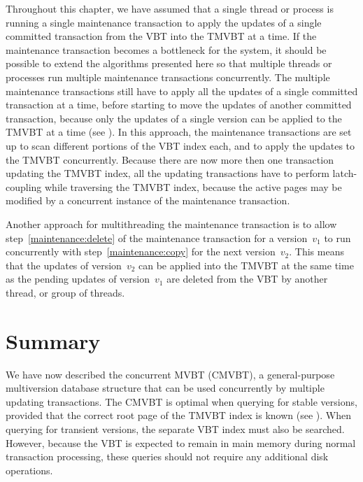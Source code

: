 Throughout this chapter, we have assumed that a single thread or process is
running a single maintenance transaction to apply the updates of a
single committed transaction from the VBT into the TMVBT at a time.
If the maintenance transaction becomes a bottleneck for the system, it should
be possible to extend the algorithms presented here so that multiple threads or
processes run multiple maintenance transactions concurrently. 
The multiple maintenance transactions still have to apply all the updates of a
single committed transaction at a time, before starting to move the updates of
another committed transaction, because only the updates of a single version can
be applied to the TMVBT at a time (see ).
In this approach, the maintenance transactions are set up to scan
different portions of the VBT index each, and to apply the updates to the TMVBT
concurrently.
Because there are now more then one transaction updating the
TMVBT index, all the updating transactions have to perform latch-coupling while
traversing the TMVBT index, because the active pages may be modified by a
concurrent instance of the maintenance transaction.

Another approach for multithreading the maintenance transaction is to allow
step~\ref{maintenance:delete} of the maintenance transaction for a
version~$v_1$ to run concurrently with step~\ref{maintenance:copy} for the
next version~$v_2$. 
This means that the updates of version~$v_2$ can be applied into the TMVBT at
the same time as the pending updates of version~$v_1$ are deleted from the
VBT by another thread, or group of threads.



\section{Summary}
\label{sec:cmvbt:summary}

We have now described the concurrent MVBT (CMVBT), a general-purpose
multiversion database structure that can be used concurrently by multiple
updating transactions.
The CMVBT is optimal when querying for stable versions, provided that the
correct root page of the TMVBT index is known (see
).
When querying for transient versions, the separate VBT index must also be
searched.
However, because the VBT is expected to remain in main memory during normal
transaction processing, these queries should not require any additional
disk  operations.

